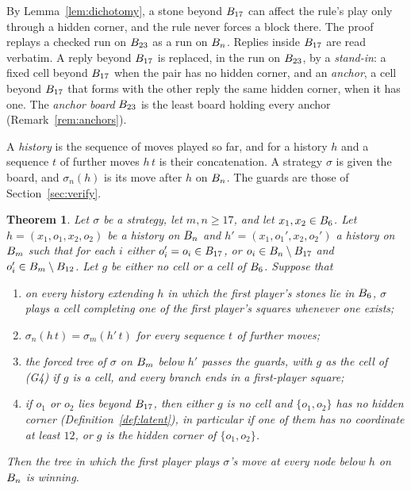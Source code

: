 \documentclass[11pt]{amsart}
\newtheorem{theorem}{Theorem}[section]
\theoremstyle{definition}
\theoremstyle{remark}
\begin{document}
By Lemma~\ref{lem:dichotomy}, a stone beyond $B_{17}$ can affect
the rule's play only through a hidden corner, and the rule never
forces a block there. The proof replays a checked run on $B_{23}$
as a run on $B_n$. Replies inside $B_{17}$ are read
verbatim. A reply beyond $B_{17}$ is
replaced, in the run on $B_{23}$, by a \emph{stand-in}: a fixed cell beyond
$B_{17}$ when the pair has no hidden corner, and an
\emph{anchor}, a cell beyond $B_{17}$ that forms with the other
reply the same hidden corner, when it has one. The \emph{anchor board}
$B_{23}$ is the least board holding every anchor
(Remark~\ref{rem:anchors}).

A \emph{history} is the sequence of moves played so far, and for a
history $h$ and a sequence $t$ of further moves $h\,t$ is their
concatenation. A strategy $\sigma$ is given the board, and
$\sigma_n(h)$ is its move after $h$ on $B_n$. The guards are those
of Section~\ref{sec:verify}.

\begin{theorem}\label{thm:simulate}
Let $\sigma$ be a strategy, let $m, n \ge 17$, and let
$x_1, x_2 \in B_6$. Let $h = (x_1, o_1, x_2, o_2)$ be a history
on $B_n$ and $h' = (x_1, o_1', x_2, o_2')$ a history on
$B_m$ such that for each $i$ either $o_i' = o_i \in B_{17}$,
or $o_i \in B_n \setminus B_{17}$ and
$o_i' \in B_m \setminus B_{12}$. Let $g$ be either no cell or
a cell of $B_6$. Suppose that
\begin{enumerate}
\item[(i)] on every history extending $h$ in which the first player's
  stones lie in $B_6$, $\sigma$ plays a cell completing one of the
  first player's squares whenever one exists;
\item[(ii)] $\sigma_n(h\,t) = \sigma_m(h'\,t)$ for every sequence $t$
  of further moves;
\item[(iii)] the forced tree of $\sigma$ on $B_m$ below $h'$
  passes the guards, with $g$ as the cell of (G4) if $g$ is a cell, and
  every branch ends in a first-player square;
\item[(iv)] if $o_1$ or $o_2$ lies beyond $B_{17}$, then either
  $g$ is no cell and $\{o_1, o_2\}$ has no hidden corner
  (Definition~\ref{def:latent}), in particular if one of them has no
  coordinate at least $12$, or $g$ is the hidden corner of
  $\{o_1, o_2\}$.
\end{enumerate}
Then the tree in which the first player plays $\sigma$'s move at every
node below $h$ on $B_n$ is winning.
\end{theorem}
\end{document}
